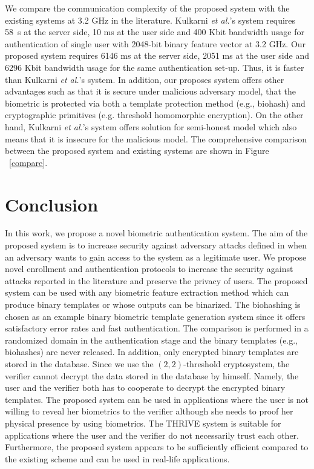 \documentclass[journal]{IEEEtran}
\begin{document}
We compare the communication complexity of the proposed system with the existing systems at 3.2 GHz in the literature. Kulkarni \textit {et al.}'s system \cite{Kulkarni} requires 58~s at the server side, 10 ms at the user side and 400 Kbit bandwidth usage for authentication of  single user with 2048-bit binary feature vector at 3.2 GHz. Our proposed system requires 6146 ms at the server side, 2051 ms at the user side and 6296 Kbit bandwidth usage for the same authentication set-up. Thus, it is faster than Kulkarni \textit {et al.}'s system. In addition, our proposes system offers other advantages such as that it is secure under malicious adversary model, that the biometric is protected via both a template protection method (e.g., biohash) and cryptographic primitives (e.g. threshold homomorphic encryption). On the other hand, Kulkarni \textit {et al.}'s system offers solution for semi-honest model which also means that it is insecure for the malicious model. The comprehensive comparison between the proposed system and existing systems are shown in Figure ~\ref{compare}. 

\section{Conclusion}

In this work, we propose a novel biometric authentication system. The aim of the proposed system is to increase security against adversary attacks defined in \cite{Ratha2} when an adversary wants to gain access to the system as a legitimate user. We propose novel enrollment and authentication protocols to increase the security against attacks reported in the literature and preserve the privacy of users. The proposed system can be used with any biometric feature extraction method which can produce binary templates or whose outputs can be binarized. The biohashing is chosen as an example binary biometric template generation system since it offers satisfactory error rates and fast authentication. The comparison is performed in a randomized domain in the authentication stage and the binary templates (e.g., biohashes) are never released. In addition, only encrypted binary templates are stored in the database. Since we use the $(2,2)$-threshold cryptosystem, the verifier cannot decrypt the data stored in the database by himself. Namely, the user and the verifier both has to cooperate to decrypt the encrypted binary templates. The proposed system can be used in applications where the user is not willing to reveal her biometrics to the verifier although she needs to proof her physical presence by using biometrics. The THRIVE system is suitable for applications where the user and the verifier do not necessarily trust each other. Furthermore, the proposed system appears to be sufficiently efficient compared to the existing scheme and can be used in real-life applications.
\end{document}
